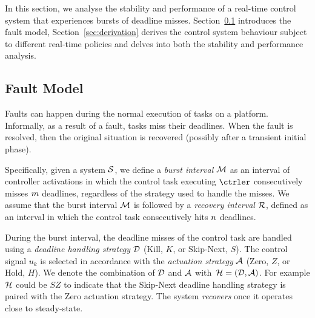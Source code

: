 In this section, we analyse the stability and performance of a real-time control system that experiences bursts of deadline misses. 
Section~\ref{sec:fault} introduces the fault model, Section~\ref{sec:derivation} derives the control system behaviour subject to different real-time policies and delves into both the stability and performance analysis.

\subsection{Fault Model}%
\label{sec:fault}

Faults can happen during the normal execution of tasks on a platform.
Informally, as a result of a fault, tasks miss their deadlines.
When the fault is resolved, then the original situation is recovered (possibly after a transient initial phase).

Specifically, given a system $\mathcal{S}$, we define a \emph{burst interval} $\mathcal{M}$ as an interval of controller activations in which the control task executing $\ctrler$ consecutively misses $m$ deadlines, regardless of the strategy used to handle the misses.
We assume that the burst interval $\mathcal{M}$ is followed by a \emph{recovery interval} $\mathcal{R}$, defined as an interval in which the control task consecutively hits $n$ deadlines.

During the burst interval, the deadline misses of the control task are handled using a \emph{deadline handling strategy} $\mathcal{D}$ (Kill, $K$, or Skip-Next, $S$).
The control signal $u_k$ is selected in accordance with the \emph{actuation strategy} $\mathcal{A}$ (Zero, $Z$, or Hold, $H$).
We denote the combination of $\mathcal{D}$ and $\mathcal{A}$ with~$\mathcal{H} = \left(\mathcal{D},\mathcal{A}\right)$.
For example $\mathcal{H}$ could be $SZ$ to indicate that the Skip-Next deadline handling strategy is paired with the Zero actuation strategy.
The system \emph{recovers} once it operates close to steady-state.

